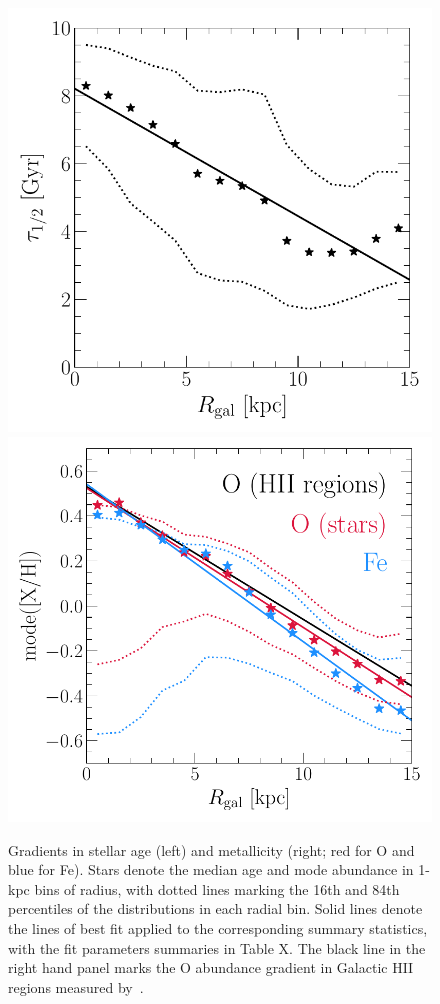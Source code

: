 \begin{figure}
\centering
\includegraphics[scale = 0.51]{age_gradient.pdf}
\includegraphics[scale = 0.5]{gradxh.pdf}
\caption{
Gradients in stellar age (left) and metallicity (right; red for O and blue for
Fe).
Stars denote the median age and mode abundance in 1-kpc bins of radius, with
dotted lines marking the 16th and 84th percentiles of the distributions in each
radial bin.
Solid lines denote the lines of best fit applied to the corresponding summary
statistics, with the fit parameters summaries in Table X.
The black line in the right hand panel marks the O abundance gradient in
Galactic HII regions measured by~\citet{MendezDelgado2022}.
}
\label{outflows:fig:gradxh-gradage}
\end{figure}

